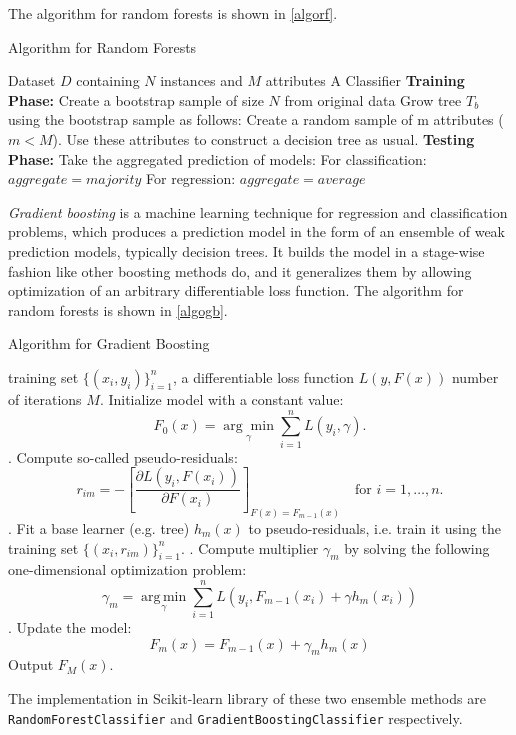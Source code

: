 \documentclass{standalone}
\begin{document}
The algorithm for random forests is shown in \cref{algorf}.

\begin{algorithm}[H]
\caption{Algorithm for Random Forests}\label{algorf}
\begin{algorithmic}
\renewcommand{\algorithmicrequire}{\textbf{Input:}}
\renewcommand{\algorithmicensure}{\textbf{Output:}}
\newcommand{\INDSTATE}[1][1]{\STATE\hspace{#1\algorithmicindent}}
\REQUIRE Dataset $D$ containing $N$ instances and $M$ attributes
\ENSURE  A Classifier
\INDSTATE[-1] \textbf{Training Phase:}
\STATE Create a bootstrap sample of size $N$ from original data
\STATE Grow tree $T_b$ using the bootstrap sample as follows:
\INDSTATE Create a random sample of m attributes ($m < M$).
\INDSTATE Use these attributes to construct a decision tree as usual.
\ENDFOR
\INDSTATE[-1] \textbf{Testing Phase:}
\STATE Take the aggregated prediction of models:
\INDSTATE For classification: $aggregate = majority$
\INDSTATE For regression: $aggregate = average$
\ENDFOR
\end{algorithmic}
\end{algorithm}

\emph{Gradient boosting}\cite{friedman2001greedy} is a machine learning
technique for regression and classification problems, which produces a
prediction model in the form of an ensemble of weak prediction models,
typically decision trees. It builds the model in a stage-wise fashion like
other boosting methods do, and it generalizes them by allowing optimization of
an arbitrary differentiable loss function. The algorithm for random forests is
shown in \cref{algogb}.

\begin{algorithm}[!ht]
\caption{Algorithm for Gradient Boosting\cite{GB:Wikipedia}}\label{algogb}
\begin{algorithmic}
\renewcommand{\algorithmicrequire}{\textbf{Input:}}
\renewcommand{\algorithmicensure}{\textbf{Algorithm:}}
\newcommand{\INDSTATE}[1][1]{\STATE\hspace{#1\algorithmicindent}}
\REQUIRE training set $\displaystyle \{(x_{i},y_{i})\}_{i=1}^{n}$, a differentiable loss function {$\displaystyle L(y,F(x))$} number of iterations $M$.
\ENSURE
\STATE Initialize model with a constant value:
\[F_0(x) = \underset{\gamma}{\arg\min} \sum_{i=1}^n L(y_i, \gamma).\]
. Compute so-called pseudo-residuals:
\[r_{im} = -\left[\frac{\partial L(y_i, F(x_i))}{\partial F(x_i)}\right]_{F(x)=F_{m-1}(x)} \quad \mbox{for } i=1,\ldots,n.\]
. Fit a base learner (e.g. tree) {$\displaystyle h_{m}(x)$} to pseudo-residuals, i.e. train it using the training set {$\displaystyle \{(x_{i},r_{im})\}_{i=1}^{n}$}.
. Compute multiplier {$\displaystyle \gamma _{m}$} by solving the following one-dimensional optimization\cite{LS:Wikipedia} problem:
\[\gamma_m = \underset{\gamma}{\operatorname{arg\,min}} \sum_{i=1}^n L\left(y_i, F_{m-1}(x_i) + \gamma h_m(x_i)\right)\]
. Update the model:
\[F_{m}(x)=F_{{m-1}}(x)+\gamma _{m}h_{m}(x)\]
\ENDFOR
\STATE Output $\displaystyle F_{M}(x)$.
\end{algorithmic}
\end{algorithm}

The implementation in Scikit-learn library of these two ensemble methods are
\verb|RandomForestClassifier| and \verb|GradientBoostingClassifier|
respectively.
\end{document}
